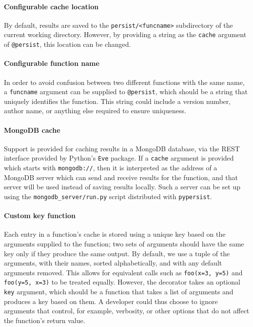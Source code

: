 \documentclass{deliverablereport}
\newcommand{\pypersist}{\texttt{pypersist}}
\begin{document}
\paragraph{Configurable cache location}
By default, results are saved to the \texttt{persist/<funcname>} subdirectory of
the current working directory.  However, by providing a string as the
\texttt{cache} argument of \texttt{@persist}, this location can be changed.

\paragraph{Configurable function name}
In order to avoid confusion between two different functions with the same name,
a \texttt{funcname} argument can be supplied to \texttt{@persist}, which should
be a string that uniquely identifies the function.  This string could include a
version number, author name, or anything else required to ensure uniqueness.

\paragraph{MongoDB cache}
Support is provided for caching results in a MongoDB database, via the REST
interface provided by Python's \texttt{Eve} package.  If a \texttt{cache}
argument is provided which starts with \texttt{mongodb://}, then it is
interpreted as the address of a MongoDB server which can send and receive
results for the function, and that server will be used instead of saving results
locally.  Such a server can be set up using the \texttt{mongodb\_server/run.py}
script distributed with \pypersist{}.

\paragraph{Custom key function}
Each entry in a function's cache is stored using a unique key based on the
arguments supplied to the function; two sets of arguments should have the same
key only if they produce the same output.  By default, we use a tuple of the
arguments, with their names, sorted alphabetically, and with any default
arguments removed.  This allows for equivalent calls such as \texttt{foo(x=3,
  y=5)} and \texttt{foo(y=5, x=3)} to be treated equally.  However, the
decorator takes an optional \texttt{key} argument, which should be a function
that takes a list of arguments and produces a key based on them.  A developer
could thus choose to ignore arguments that control, for example, verbosity, or
other options that do not affect the function's return value.
\end{document}
